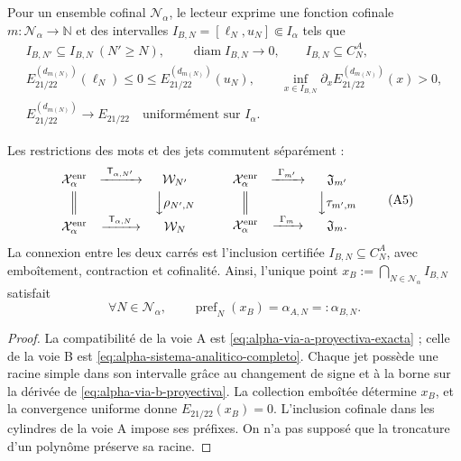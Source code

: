 Pour un ensemble cofinal \(\mathcal N_\alpha\), le lecteur exprime une fonction cofinale \(m:\mathcal N_\alpha\to\mathbb N\) et des intervalles \(I_{B,N}=[\ell_N,u_N]\Subset I_\alpha\) tels que
\begin{equation}
\begin{gathered}
 I_{B,N'}\subseteq I_{B,N}\ (N'\ge N),\qquad
 \operatorname{diam}I_{B,N}\longrightarrow0,\qquad
 I_{B,N}\subseteq C_N^A,\\
 E_{21/22}^{(d_{m(N)})}(\ell_N)\le0\le
 E_{21/22}^{(d_{m(N)})}(u_N),\qquad
 \inf_{x\in I_{B,N}}\partial_xE_{21/22}^{(d_{m(N)})}(x)>0,\\
 E_{21/22}^{(d_{m(N)})}\longrightarrow E_{21/22}
 \quad\text{uniformément sur }I_\alpha .
\end{gathered}
 \tag{A4}
 \label{eq:alpha-via-b-proyectiva}
\end{equation}

\begin{proposition}
\label{prop:alpha-cuadrados-compatibilidad-historico-rev04}
Les restrictions des mots et des jets commutent séparément :
\[
\begin{array}{ccc}
 \mathcal X_\alpha^{\mathrm{enr}}&
 \xrightarrow{\ \mathsf T_{\alpha,N'}\ }&\mathcal W_{N'}\\[1mm]
 \Big\Vert&&\Big\downarrow\rho_{N',N}\\[1mm]
 \mathcal X_\alpha^{\mathrm{enr}}&
 \xrightarrow{\ \mathsf T_{\alpha,N}\ }&\mathcal W_N
\end{array}
\qquad
\begin{array}{ccc}
 \mathcal X_\alpha^{\mathrm{enr}}&
 \xrightarrow{\ \Gamma_{m'}\ }&\mathfrak J_{m'}\\[1mm]
 \Big\Vert&&\Big\downarrow\tau_{m',m}\\[1mm]
 \mathcal X_\alpha^{\mathrm{enr}}&
 \xrightarrow{\ \Gamma_m\ }&\mathfrak J_m .
\end{array}
 \tag{A5}
\]
La connexion entre les deux carrés est l'inclusion certifiée \(I_{B,N}\subseteq C_N^A\), avec emboîtement, contraction et cofinalité. Ainsi, l'unique point \(x_B:=\bigcap_{N\in\mathcal N_\alpha}I_{B,N}\) satisfait
\begin{equation}
 \forall N\in\mathcal N_\alpha,\qquad
 \operatorname{pref}_N(x_B)=\alpha_{A,N}=:\alpha_{B,N}.
 \tag{A6}
 \label{eq:alpha-igualdad-cada-nivel}
\end{equation}
\end{proposition}

\begin{proof}
La compatibilité de la voie A est \eqref{eq:alpha-via-a-proyectiva-exacta} ; celle de la voie B est \eqref{eq:alpha-sistema-analitico-completo}. Chaque jet possède une racine simple dans son intervalle grâce au changement de signe et à la borne sur la dérivée de \eqref{eq:alpha-via-b-proyectiva}. La collection emboîtée détermine \(x_B\), et la convergence uniforme donne \(E_{21/22}(x_B)=0\). L'inclusion cofinale dans les cylindres de la voie A impose ses préfixes. On n'a pas supposé que la troncature d'un polynôme préserve sa racine.
\end{proof}

